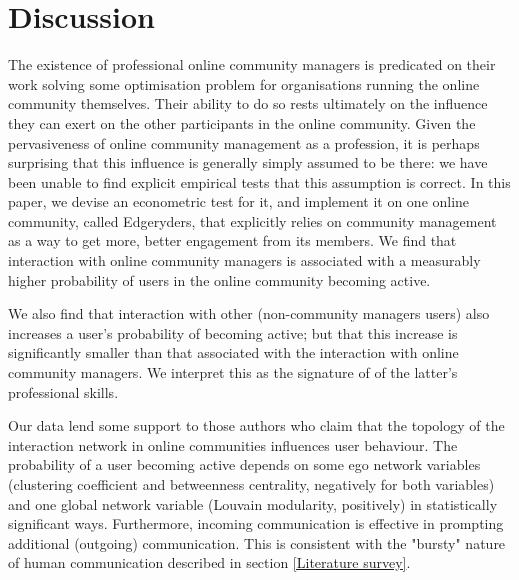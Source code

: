 \section{Discussion}

The existence of professional online community managers is predicated on their work solving some optimisation problem for organisations running the online community themselves. Their ability to do so rests ultimately on the influence they can exert on the other participants in the online community. Given the pervasiveness of online community management as a profession, it is perhaps surprising that this influence is generally simply assumed to be there: we have been unable to find explicit empirical tests that this assumption is correct. In this paper, we devise an econometric test for it, and implement it on one online community, called Edgeryders, that explicitly relies on community management as a way to get more, better engagement from its members. We find that interaction with online community managers is associated with a measurably higher probability of users in the online community becoming active. 

We also find that interaction with other (non-community managers users) also increases a user's probability of becoming active; but that this increase is significantly smaller than that associated with the interaction with online community managers. We interpret this as the signature of of the latter's professional skills. 

Our data lend some support to those authors who claim that the topology of the interaction network in online communities influences user behaviour. The probability of a user becoming active depends on some ego network variables (clustering coefficient and betweenness centrality, negatively for both variables) and one global network variable (Louvain modularity, positively) in statistically significant ways. Furthermore, incoming communication is effective in prompting additional (outgoing) communication. This is consistent with the "bursty" nature of human communication described in section \ref{Literature survey}.

